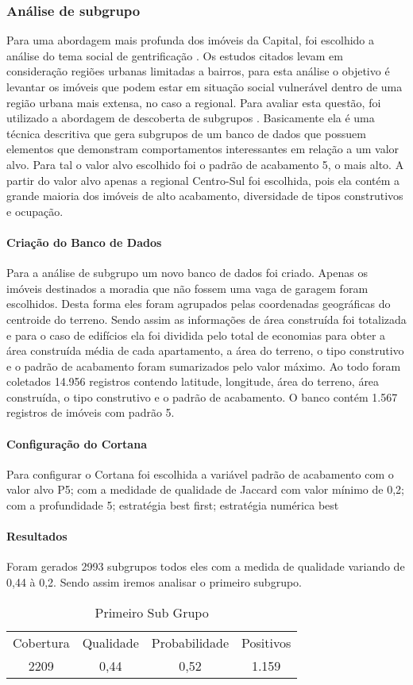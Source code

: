 \documentclass[12pt]{article}
\begin{document}
\subsubsection{Análise de subgrupo}
Para uma abordagem mais profunda dos imóveis da Capital, foi escolhido a análise do tema social de gentrificação \cite{dos2019sapucai, solla2019resistencia, andrade2020urban}. Os estudos citados levam em consideração regiões urbanas limitadas a bairros, para esta análise o objetivo é levantar os imóveis que podem estar em situação social vulnerável dentro de uma região urbana mais extensa, no caso a regional. Para avaliar esta questão, foi utilizado a abordagem de descoberta de subgrupos \cite{atzmueller2015subgroup}. Basicamente ela é uma técnica descritiva que gera subgrupos de um banco de dados que possuem elementos que demonstram comportamentos interessantes em relação a um valor alvo. Para tal o valor alvo escolhido foi o padrão de acabamento 5, o mais alto. A partir do valor alvo apenas a regional Centro-Sul foi escolhida, pois ela contém a grande maioria dos imóveis de alto acabamento, diversidade de tipos construtivos e ocupação.

\paragraph{Criação do Banco de Dados}
Para a análise de subgrupo um novo banco de dados foi criado. Apenas os imóveis destinados a moradia que não fossem uma vaga de garagem foram escolhidos. Desta forma eles foram agrupados pelas coordenadas geográficas do centroide do terreno. Sendo assim as informações de área construída foi totalizada e para o caso de edifícios ela foi dividida pelo total de economias para obter a área construída média de cada apartamento, a área do terreno, o tipo construtivo e o padrão de acabamento foram sumarizados pelo valor máximo. Ao todo foram coletados 14.956 registros contendo latitude, longitude, área do terreno, área construída, o tipo construtivo e o padrão de acabamento. O banco contém 1.567 registros de imóveis com padrão 5.

\paragraph{Configuração do Cortana}
Para configurar o Cortana foi escolhida a variável padrão de acabamento com o valor alvo P5; com a medidade de qualidade de Jaccard com valor mínimo de 0,2; com a profundidade 5; estratégia best first; estratégia numérica best
\paragraph{Resultados}
Foram gerados 2993 subgrupos todos eles com a medida de qualidade variando de 0,44 à 0,2. Sendo assim iremos analisar o primeiro subgrupo.
\begin{table}[ht]
\centering
\label{table:sub}
\begin{tabular}{cccc}
 Cobertura & Qualidade & Probabilidade & Positivos  \\
 2209 & 0,44 & 0,52  &  1.159  \\
\end{tabular}
\caption{Primeiro Sub Grupo}
\end{table}
\end{document}
